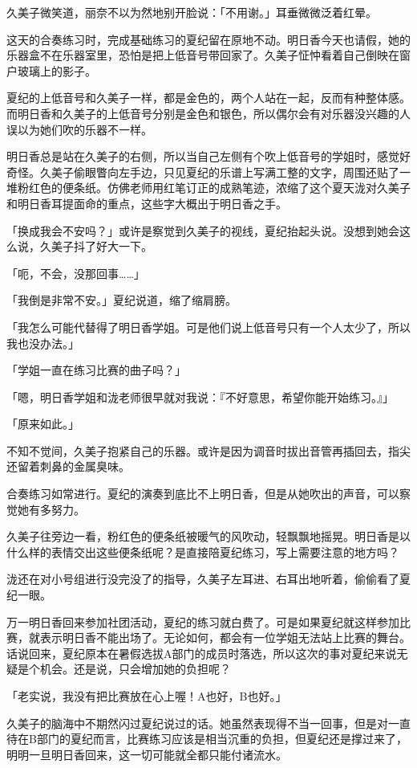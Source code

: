 \documentclass[UTF8]{ctexart}
\begin{document}
    久美子微笑道，丽奈不以为然地别开脸说：「不用谢。」耳垂微微泛着红晕。 

    这天的合奏练习时，完成基础练习的夏纪留在原地不动。明日香今天也请假，她的乐器盒不在乐器室里，恐怕是把上低音号带回家了。久美子怔忡看着自己倒映在窗户玻璃上的影子。 

    夏纪的上低音号和久美子一样，都是金色的，两个人站在一起，反而有种整体感。而明日香和久美子的上低音号分别是金色和银色，所以偶尔会有对乐器没兴趣的人误以为她们吹的乐器不一样。 

    明日香总是站在久美子的右侧，所以当自己左侧有个吹上低音号的学姐时，感觉好奇怪。久美子偷眼瞥向左手边，只见夏纪的乐谱上写满工整的文字，周围还贴了一堆粉红色的便条纸。仿佛老师用红笔订正的成熟笔迹，浓缩了这个夏天泷对久美子和明日香耳提面命的重点，这些字大概出于明日香之手。 

    「换成我会不安吗？」或许是察觉到久美子的视线，夏纪抬起头说。没想到她会这么说，久美子抖了好大一下。 

    「呃，不会，没那回事……」 

    「我倒是非常不安。」夏纪说道，缩了缩肩膀。 

    「我怎么可能代替得了明日香学姐。可是他们说上低音号只有一个人太少了，所以我也没办法。」 

    「学姐一直在练习比赛的曲子吗？」 

    「嗯，明日香学姐和泷老师很早就对我说：『不好意思，希望你能开始练习。』」 

    「原来如此。」 

    不知不觉间，久美子抱紧自己的乐器。或许是因为调音时拔出音管再插回去，指尖还留着刺鼻的金属臭味。 

    合奏练习如常进行。夏纪的演奏到底比不上明日香，但是从她吹出的声音，可以察觉她有多努力。 

    久美子往旁边一看，粉红色的便条纸被暖气的风吹动，轻飘飘地摇晃。明日香是以什么样的表情交出这些便条纸呢？是直接陪夏纪练习，写上需要注意的地方吗？ 

    泷还在对小号组进行没完没了的指导，久美子左耳进、右耳出地听着，偷偷看了夏纪一眼。 

    万一明日香回来参加社团活动，夏纪的练习就白费了。可是如果夏纪就这样参加比赛，就表示明日香不能出场了。无论如何，都会有一位学姐无法站上比赛的舞台。话说回来，夏纪原本在暑假选拔A部门的成员时落选，所以这次的事对夏纪来说无疑是个机会。还是说，只会增加她的负担呢？ 

    「老实说，我没有把比赛放在心上喔！A也好，B也好。」 

    久美子的脑海中不期然闪过夏纪说过的话。她虽然表现得不当一回事，但是对一直待在B部门的夏纪而言，比赛练习应该是相当沉重的负担，但夏纪还是撑过来了，明明一旦明日香回来，这一切可能就全都只能付诸流水。 
\end{document}

